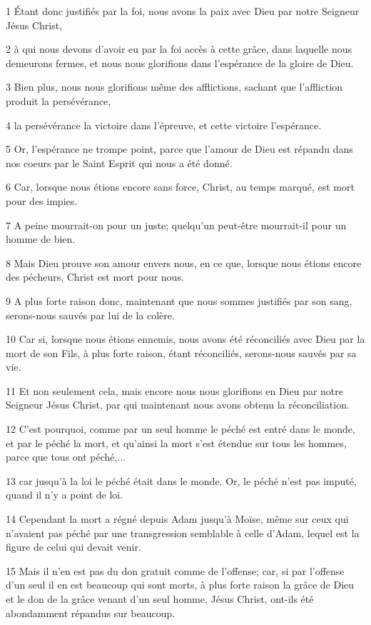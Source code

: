 \par 1 Étant donc justifiés par la foi, nous avons la paix avec Dieu par notre Seigneur Jésus Christ,
\par 2 à qui nous devons d'avoir eu par la foi accès à cette grâce, dans laquelle nous demeurons fermes, et nous nous glorifions dans l'espérance de la gloire de Dieu.
\par 3 Bien plus, nous nous glorifions même des afflictions, sachant que l'affliction produit la persévérance,
\par 4 la persévérance la victoire dans l'épreuve, et cette victoire l'espérance.
\par 5 Or, l'espérance ne trompe point, parce que l'amour de Dieu est répandu dans nos coeurs par le Saint Esprit qui nous a été donné.
\par 6 Car, lorsque nous étions encore sans force, Christ, au temps marqué, est mort pour des impies.
\par 7 A peine mourrait-on pour un juste; quelqu'un peut-être mourrait-il pour un homme de bien.
\par 8 Mais Dieu prouve son amour envers nous, en ce que, lorsque nous étions encore des pécheurs, Christ est mort pour nous.
\par 9 A plus forte raison donc, maintenant que nous sommes justifiés par son sang, serons-nous sauvés par lui de la colère.
\par 10 Car si, lorsque nous étions ennemis, nous avons été réconciliés avec Dieu par la mort de son Fils, à plus forte raison, étant réconciliés, serons-nous sauvés par sa vie.
\par 11 Et non seulement cela, mais encore nous nous glorifions en Dieu par notre Seigneur Jésus Christ, par qui maintenant nous avons obtenu la réconciliation.
\par 12 C'est pourquoi, comme par un seul homme le péché est entré dans le monde, et par le péché la mort, et qu'ainsi la mort s'est étendue sur tous les hommes, parce que tous ont péché,...
\par 13 car jusqu'à la loi le péché était dans le monde. Or, le péché n'est pas imputé, quand il n'y a point de loi.
\par 14 Cependant la mort a régné depuis Adam jusqu'à Moïse, même sur ceux qui n'avaient pas péché par une transgression semblable à celle d'Adam, lequel est la figure de celui qui devait venir.
\par 15 Mais il n'en est pas du don gratuit comme de l'offense; car, si par l'offense d'un seul il en est beaucoup qui sont morts, à plus forte raison la grâce de Dieu et le don de la grâce venant d'un seul homme, Jésus Christ, ont-ils été abondamment répandus sur beaucoup.
